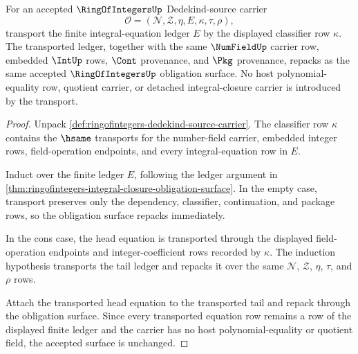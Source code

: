 \begin{theorem}
\label{thm:ringofintegers-equation-ledger-transport-closure}
For an accepted $\RingOfIntegersUp$ Dedekind-source carrier
$$
\mathcal O=(\mathcal N,\mathcal Z,\eta,E,\kappa,\tau,\rho),
$$
transport the finite integral-equation ledger $E$ by the displayed classifier
row $\kappa$. The transported ledger, together with the same
$\NumFieldUp$ carrier row, embedded $\IntUp$ rows, $\Cont$ provenance, and
$\Pkg$ provenance, repacks as the same accepted
$\RingOfIntegersUp$ obligation surface. No host polynomial-equality row,
quotient carrier, or detached integral-closure carrier is introduced by the
transport.
\end{theorem}
\begin{proof}
Unpack \autoref{def:ringofintegers-dedekind-source-carrier}. The classifier row
$\kappa$ contains the $\hsame$ transports for the number-field carrier, embedded
integer rows, field-operation endpoints, and every integral-equation row in
$E$.

Induct over the finite ledger $E$, following the ledger argument in
\autoref{thm:ringofintegers-integral-closure-obligation-surface}. In the empty
case, transport preserves only the dependency, classifier, continuation, and
package rows, so the obligation surface repacks immediately.

In the cons case, the head equation is transported through the displayed
field-operation endpoints and integer-coefficient rows recorded by $\kappa$.
The induction hypothesis transports the tail ledger and repacks it over the
same $\mathcal N$, $\mathcal Z$, $\eta$, $\tau$, and $\rho$ rows.

Attach the transported head equation to the transported tail and repack through
the obligation surface. Since every transported equation row remains a row of
the displayed finite ledger and the carrier has no host polynomial-equality or
quotient field, the accepted surface is unchanged.
\end{proof}

